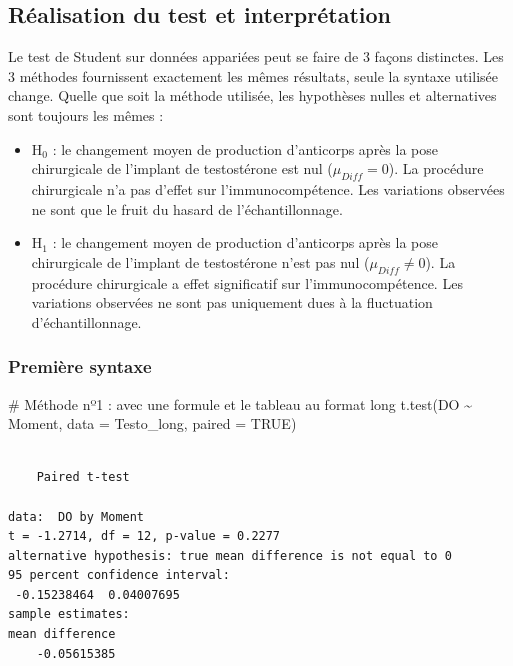 \documentclass[
  a4paper,
  DIV=11,
  numbers=noendperiod,
  oneside]{scrreprt}
\newenvironment{Shaded}{}{}
\newcommand{\AttributeTok}[1]{\textcolor[rgb]{0.84,0.23,0.29}{#1}}
\newcommand{\CommentTok}[1]{\textcolor[rgb]{0.42,0.45,0.49}{#1}}
\newcommand{\ConstantTok}[1]{\textcolor[rgb]{0.00,0.36,0.77}{#1}}
\newcommand{\FunctionTok}[1]{\textcolor[rgb]{0.44,0.26,0.76}{#1}}
\newcommand{\NormalTok}[1]{\textcolor[rgb]{0.14,0.16,0.18}{#1}}
\newcommand{\SpecialCharTok}[1]{\textcolor[rgb]{0.00,0.36,0.77}{#1}}
\providecommand{\tightlist}{%
  \setlength{\itemsep}{0pt}\setlength{\parskip}{0pt}}\usepackage{longtable,booktabs,array}
\begin{document}
\hypertarget{ruxe9alisation-du-test-et-interpruxe9tation}{%
\subsection{Réalisation du test et
interprétation}\label{ruxe9alisation-du-test-et-interpruxe9tation}}

Le test de Student sur données appariées peut se faire de 3 façons
distinctes. Les 3 méthodes fournissent exactement les mêmes résultats,
seule la syntaxe utilisée change. Quelle que soit la méthode utilisée,
les hypothèses nulles et alternatives sont toujours les mêmes :

\begin{itemize}
\tightlist
\item
  H\(_0\) : le changement moyen de production d'anticorps après la pose
  chirurgicale de l'implant de testostérone est nul
  (\(\mu_{Diff} = 0\)). La procédure chirurgicale n'a pas d'effet sur
  l'immunocompétence. Les variations observées ne sont que le fruit du
  hasard de l'échantillonnage.
\item
  H\(_1\) : le changement moyen de production d'anticorps après la pose
  chirurgicale de l'implant de testostérone n'est pas nul
  (\(\mu_{Diff} \neq 0\)). La procédure chirurgicale a effet
  significatif sur l'immunocompétence. Les variations observées ne sont
  pas uniquement dues à la fluctuation d'échantillonnage.
\end{itemize}

\hypertarget{premiuxe8re-syntaxe}{%
\subsubsection{Première syntaxe}\label{premiuxe8re-syntaxe}}

\begin{Shaded}
\begin{Highlighting}[]
\CommentTok{\# Méthode nº1 : avec une formule et le tableau au format long}
\FunctionTok{t.test}\NormalTok{(DO }\SpecialCharTok{\textasciitilde{}}\NormalTok{ Moment, }\AttributeTok{data =}\NormalTok{ Testo\_long, }\AttributeTok{paired =} \ConstantTok{TRUE}\NormalTok{)}
\end{Highlighting}
\end{Shaded}

\begin{verbatim}

    Paired t-test

data:  DO by Moment
t = -1.2714, df = 12, p-value = 0.2277
alternative hypothesis: true mean difference is not equal to 0
95 percent confidence interval:
 -0.15238464  0.04007695
sample estimates:
mean difference 
    -0.05615385 
\end{verbatim}
\end{document}
